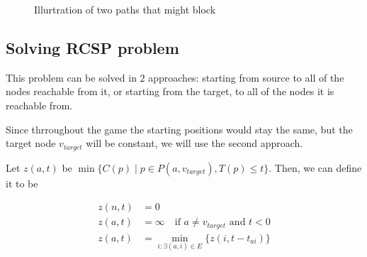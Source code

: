 \documentclass[12pt]{article}
\newcommand*{\target}{\ensuremath{v_{target}}}
\begin{document}
\begin{figure}[H]\centering
    \caption{Illurtration of two paths that might block}
\end{figure}


\subsection{Solving RCSP problem}

This problem can be solved in 2 approaches:
starting from source to all of the nodes reachable from it,
or starting from the target, to all of the nodes it is reachable from.

Since thrroughout the game the starting positions would stay the same,
but the target node $\target$ will be constant, we will use the second approach.

Let $z(a, t)$ be $\min \{ C(p) \mid p \in P(a,\target), T(p) \leq t \}$.
Then, we can define it to be

\begin{align}
    z(n,t) & = 0                                                   \\
    z(a,t) & = \infty \quad \text{if $a \neq \target$ and $t < 0$} \\
    z(a,t) & =
    \min\limits_{i : \exists (a,i) \in E}
    \Big\{
    z(i, t - t_{ai})
    \Big\}
\end{align}
\end{document}
